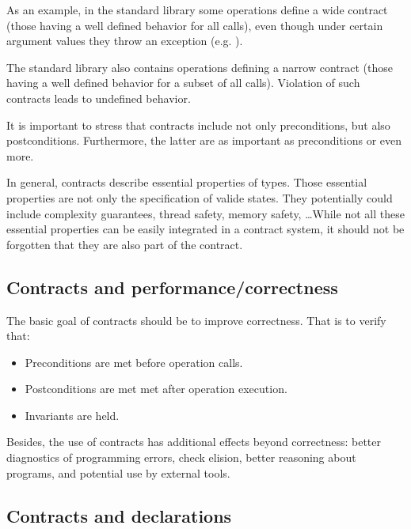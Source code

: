 As an example, in the standard library some operations define a wide contract
(those having a well defined behavior for all calls), even though under certain
argument values they throw an exception (e.g. ).

The standard library also contains operations defining a narrow contract (those
having a well defined behavior for a subset of all calls). Violation of such
contracts leads to undefined behavior.

It is important to stress that contracts include not only preconditions, but
also postconditions. Furthermore, the latter 
are as important as preconditions or even more.

In general, contracts describe essential properties of types. Those essential
properties are not only the specification of valide states. They potentially could
include complexity guarantees, thread safety, memory safety, \ldots While not all
these essential properties can be easily integrated in a contract system, it should
not be forgotten that they are also part of the contract.


\subsection{Contracts and performance/correctness}

The basic goal of contracts should be to improve correctness. That is to verify
that:

\begin{itemize}
\item Preconditions are met before operation calls.
\item Postconditions are met met after operation execution.
\item Invariants are held.
\end{itemize}

Besides, the use of contracts has additional effects beyond correctness: better
diagnostics of programming errors, check elision, better reasoning about
programs, and potential use by external tools.



\subsection{Contracts and declarations}

